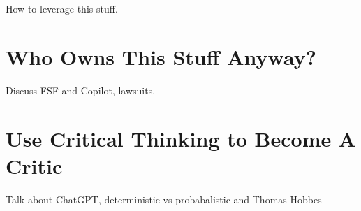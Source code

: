 How to leverage this stuff.

\section{Who Owns This Stuff Anyway?}

Discuss FSF and Copilot, lawsuits.

\section{Use Critical Thinking to Become A Critic}

Talk about ChatGPT, deterministic vs probabalistic and Thomas Hobbes 


